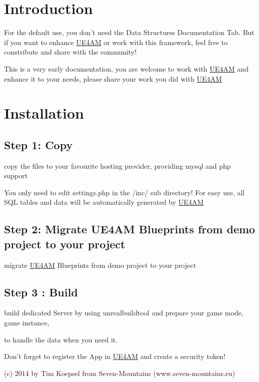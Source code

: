 \hypertarget{index_intro_sec}{}\section{Introduction}\label{index_intro_sec}
For the default use, you don't need the Data Structures Documentation Tab. But if you want to enhance \hyperlink{class_u_e4_a_m}{U\-E4\-A\-M} or work with this framework, feel free to constribute and share with the community!

This is a very early documentation, you are welcome to work with \hyperlink{class_u_e4_a_m}{U\-E4\-A\-M} and enhance it to your needs, please share your work you did with \hyperlink{class_u_e4_a_m}{U\-E4\-A\-M}\hypertarget{index_install_sec}{}\section{Installation}\label{index_install_sec}
\hypertarget{index_step1}{}\subsection{Step 1\-: Copy}\label{index_step1}
copy the files to your favourite hosting provider, providing mysql and php support

You only need to edit settings.\-php in the /inc/ sub directory! For easy use, all S\-Q\-L tables and data will be automatically generated by \hyperlink{class_u_e4_a_m}{U\-E4\-A\-M}\hypertarget{index_step2}{}\subsection{Step 2\-: Migrate U\-E4\-A\-M Blueprints from demo project to your project}\label{index_step2}
migrate \hyperlink{class_u_e4_a_m}{U\-E4\-A\-M} Blueprints from demo project to your project \hypertarget{index_step3}{}\subsection{Step 3 \-: Build}\label{index_step3}
build dedicated Server by using unrealbuildtool and prepare your game mode, game instance,

to handle the data when you need it.

Don't forget to register the App in \hyperlink{class_u_e4_a_m}{U\-E4\-A\-M} and create a security token!

(c) 2014 by Tim Koepsel from Seven-\/\-Mountains (www.\-seven-\/mountains.\-eu) 